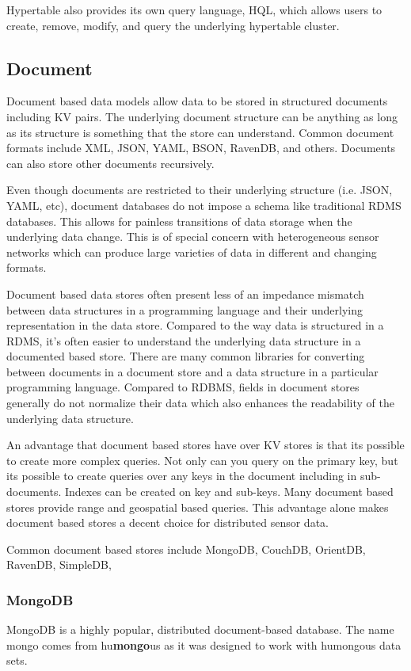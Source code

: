 \documentclass[]{article}
\begin{document}
Hypertable also provides its own query language, HQL, which allows users to create, remove, modify, and query the underlying hypertable cluster.

\subsection{Document}
Document based data models allow data to be stored in structured documents including KV pairs. The underlying document structure can be anything as long as its structure is something that the store can understand. Common document formats include XML, JSON, YAML, BSON, RavenDB, and others\cite{chen_big_2014}. Documents can also store other documents recursively.

Even though documents are restricted to their underlying structure (i.e. JSON, YAML, etc), document databases do not impose a schema like traditional RDMS databases. This allows for painless transitions of data storage when the underlying data change\cite{sharma_extended_2015}.  This is of special concern with heterogeneous sensor networks which can produce large varieties of data in different and changing formats.

Document based data stores often present less of an impedance mismatch between data structures in a programming language and their underlying representation in the data store. Compared to the way data is structured in a RDMS, it's often easier to understand the underlying data structure in a documented based store. There are many common libraries for converting between documents in a document store and a data structure in a particular programming language. Compared to RDBMS, fields in document stores generally do not normalize their data which also enhances the readability of the underlying data structure\cite{ravendb}.

An advantage that document based stores have over KV stores is that its possible to create more complex queries. Not only can you query on the primary key, but its possible to create queries over any keys in the document including in sub-documents. Indexes can be created on key and sub-keys. Many document based stores provide range and geospatial based queries. This advantage alone makes document based stores a decent choice for distributed sensor data.

Common document based stores include MongoDB, CouchDB, OrientDB, RavenDB, SimpleDB, 

\subsubsection{MongoDB}
MongoDB is a highly popular, distributed document-based database\cite{mongo_arch_2016}. The name mongo comes from hu\textbf{mongo}us as it was designed to work with humongous data sets. 
\end{document}
